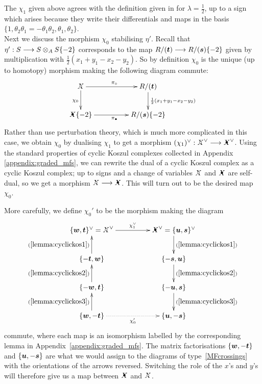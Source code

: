 \documentclass{compositio}
\theoremstyle{definition}
\numberwithin{equation}{section}
\begin{document}
The $\chi_1$ given above agrees with the definition given in \cite[p.51]{kr0401268} for $\lambda = \frac{1}{2}$, up to a sign which arises because they write their differentials and maps in the basis $\{1, \theta_2 \theta_1 = - \theta_1 \theta_2, \theta_1, \theta_2\}$.
\\

Next we discuss the morphism $\chi_0$ stabilising $\eta'$. Recall that $\eta': S \longrightarrow S \otimes_A S\{-2\}$ corresponds to the map $R/(\boldsymbol{t}) \longrightarrow R/(\boldsymbol{s})\{-2\}$ given by multiplication with $\frac{1}{2}(x_1 + y_1 - x_2 - y_2)$. So by definition $\chi_0$ is the unique (up to homotopy) morphism making the following diagram commute:
\begin{equation}\label{eq:cons50}
\xymatrix@C+2pc{
\Xcirc \ar[d]_{\chi_0} \ar[r]^{\pi_{\circ}} & R/(\boldsymbol{t}) \ar[d]^-{\frac{1}{2}(x_1+y_1-x_2-y_2)}\\
\Xbul\{-2\} \ar[r]_{\pi_{\bullet}} & R/(\boldsymbol{s})\{-2\}
}
\end{equation}
Rather than use perturbation theory, which is much more complicated in this case, we obtain $\chi_0$ by dualising $\chi_1$ to get a morphism $(\chi_1)\mdual: \Xcirc\mdual \lto \Xbul\mdual$. Using the standard properties of cyclic Koszul complexes collected in Appendix \ref{appendix:graded_mfs}, we can rewrite the dual of a cyclic Koszul complex as a cyclic Koszul complex; up to signs and a change of variables $\Xcirc$ and $\Xbul$ are self-dual, so we get a morphism $\Xcirc \lto \Xbul$. This will turn out to be the desired map $\chi_0$.

More carefully, we define $\chi_0'$ to be the morphism making the diagram
\[
\xymatrix@C+2pc{
\{ \bs{w}, \bs{t} \}\mdual = \Xcirc\mdual \ar[r]^-{\chi_1\mdual} & \Xbul\mdual = \{ \bs{u}, \bs{s} \}\mdual \ar[d]^-{(\ref{lemma:cyclickos1})}\\
\{ -\bs{t}, \bs{w} \} \ar[u]^-{(\ref{lemma:cyclickos1})} & \{ -\bs{s}, \bs{u} \} \ar[d]^-{(\ref{lemma:cyclickos2})}\\
\{ -\bs{w}, \bs{t} \} \ar[u]^-{(\ref{lemma:cyclickos2})} & \{ -\bs{u}, \bs{s} \} \ar[d]^-{(\ref{lemma:cyclickos3})}\\
\{ \bs{w}, -\bs{t} \} \ar@{.>}[r]_-{\chi_0'} \ar[u]^-{(\ref{lemma:cyclickos3})} & \{ \bs{u}, -\bs{s} \}
}
\]
commute, where each map is an isomorphism labelled by the corresponding lemma in Appendix~\ref{appendix:graded_mfs}. The matrix factorisations $\{ \boldsymbol{w}, -\boldsymbol{t} \}$ and $\{ \boldsymbol{u}, -\boldsymbol{s} \}$ are what we would assign to the diagrams of type~\eqref{MFcrossings} with the orientations of the arrows reversed. Switching the role of the $x$'s and $y$'s will therefore give us a map between $\Xbul$ and $\Xcirc$.
\end{document}
